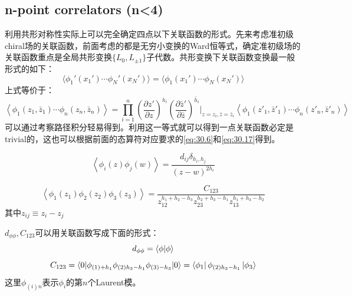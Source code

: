 \subsection{n-point correlators (n<4)}
利用共形对称性实际上可以完全确定四点以下关联函数的形式。先来考虑准初级chiral场的关联函数，前面考虑的都是无穷小变换的Ward恒等式，确定准初级场的关联函数重点是全局共形变换$\{L_0,L_{\pm1}\}$子代数。共形变换下关联函数变换最一般形式的如下：
\begin{equation}\label{global ward}
	\boxed{
	\langle\phi_1'(x_1')\cdots\phi_N'(x_N')\rangle=\langle\phi_1(x_1')\cdots\phi_N(x_N')\rangle
	}
\end{equation}
上式等价于：
\begin{equation}\label{31.29}
	\left\langle\phi_{1}\left(z_{1},\bar{z}_{1}\right)\cdots\phi_{n}\left(z_{n},\bar{z}_{n}\right)\right\rangle=\prod_{i=1}^{n}\left(\frac{\partial z'}{\partial z}\right)^{h_{i}}\left(\frac{\partial\bar{z}'}{\partial\bar{z}}\right)^{\bar{h}_{i}}\Bigg|_{z=z_{i},\bar{z}=\bar{z}_{i}}\left\langle\phi_{1}\left(z'_{1},\bar{z}'_{1}\right)\cdots\phi_{n}\left(z'_{n},\bar{z}'_{n}\right)\right\rangle 
\end{equation}
可以通过考察路径积分轻易得到。利用这一等式就可以得到一点关联函数必定是trivial的，这也可以根据前面的态算符对应要求的\ref{eq:30.6}和\ref{eq:30.17}得到。
\begin{theorem}[2-pt]
	\begin{equation}\label{31.19}
		\left\langle\phi_i(z)\phi_j(w)\right\rangle=\frac{d_{ij}\delta_{h_i,h_j}}{(z-w)^{2h_i}}
	\end{equation}
\end{theorem}
\begin{theorem}[3-pt]
	\begin{equation}\label{31.20}
		\left\langle\phi_1(z_1)\phi_2(z_2)\phi_3(z_3)\right\rangle=\frac{C_{123}}{z_{12}^{h_1+h_2-h_3}z_{23}^{h_2+h_3-h_1}z_{13}^{h_1+h_3-h_2}}
	\end{equation}
	其中$z_{ij}\equiv z_i-z_j$
\end{theorem}
\begin{remark}
	$d_{\phi\phi},C_{123}$可以用关联函数写成下面的形式：
	\begin{equation}
		d_{\phi\phi}=\braket{\phi}{\phi}
	\end{equation}
	\begin{equation}\label{31.33}
		C_{123}=\langle0|\phi_{(1)+h_1}\phi_{(2)h_3-h_1}\phi_{(3)-h_3}|0\rangle =\bra{\phi_1}\phi_{(2)h_3-h_1}\ket{\phi_3}
	\end{equation}
	这里$\phi_{(i)n}$表示$\phi_i$的第$n$个Laurent模。
\end{remark}
